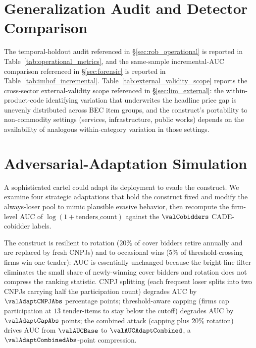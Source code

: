 \begin{table}[htbp]
\centering
\caption{Alternative Clustering of Standard Errors}
\label{tab:clustering}

\end{table}

\section{Generalization Audit and Detector Comparison}
\label{app:operational}

The temporal-holdout audit referenced in
§\ref{sec:rob_operational} is reported in
Table~\ref{tab:operational_metrics}, and the same-sample
incremental-AUC comparison referenced in §\ref{sec:forensic} is
reported in Table~\ref{tab:imhof_incremental}.
Table~\ref{tab:external_validity_scope} reports the cross-sector
external-validity scope referenced in §\ref{sec:lim_external}:
the within-product-code identifying variation that underwrites
the headline price gap is unevenly distributed across BEC item
groups, and the construct's portability to non-commodity
settings (services, infrastructure, public works) depends on
the availability of analogous within-category variation in those
settings.







\section{Adversarial-Adaptation Simulation}
\label{app:adversarial}

A sophisticated cartel could adapt its deployment to evade the
construct. We examine four strategic adaptations that hold the
construct fixed and modify the always-loser pool to mimic
plausible evasive behavior, then recompute the firm-level AUC of
$\log(1+\text{tenders\_count})$ against the $\valCobidders$
CADE-cobidder labels.



The construct is resilient to rotation ($20\%$ of cover bidders
retire annually and are replaced by fresh CNPJs) and to
occasional wins ($5\%$ of threshold-crossing firms win one
tender): AUC is essentially unchanged because the bright-line
filter eliminates the small share of newly-winning cover bidders
and rotation does not compress the ranking statistic. CNPJ
splitting (each frequent loser splits into two CNPJs carrying
half the participation count) degrades AUC by
$\valAdaptCNPJAbs$ percentage points; threshold-aware capping
(firms cap participation at $13$ tender-items to stay below the
cutoff) degrades AUC by $\valAdaptCapAbs$ points; the combined
attack (capping plus $20\%$ rotation) drives AUC from
$\valAUCBase$ to $\valAUCAdaptCombined$, a
$\valAdaptCombinedAbs$-point compression.

